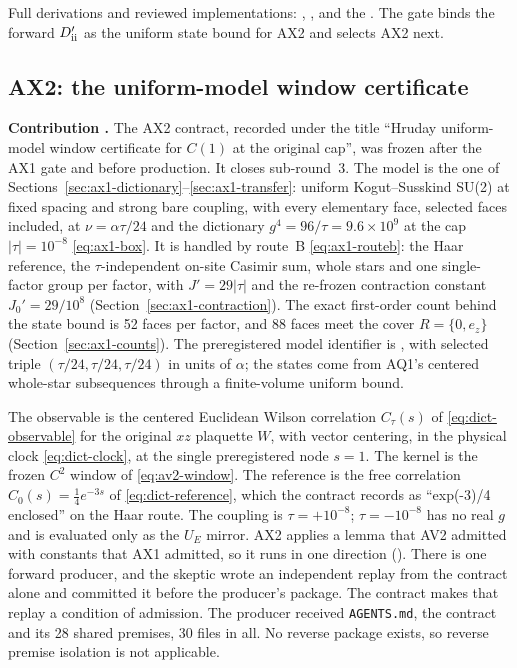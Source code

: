 Full derivations and reviewed implementations:
,
,
 and the
. The gate binds
the forward $D'_{\rm ii}$ as the uniform state bound for AX2 and selects AX2
next.

\subsection{AX2: the uniform-model window certificate}
\label{sec:ax2}

\textbf{Contribution .} The AX2 contract, recorded under
the title ``Hruday uniform-model window certificate for $C(1)$ at the original
cap'', was frozen after the AX1 gate and before production. It closes
sub-round~3. The model is the one of
Sections~\ref{sec:ax1-dictionary}--\ref{sec:ax1-transfer}: uniform
Kogut--Susskind SU(2) at fixed spacing and strong bare coupling, with every
elementary face, selected faces included, at $\nu=\alpha\tau/24$ and the
dictionary $g^4=96/\tau=9.6\times10^9$ at the cap $|\tau|=10^{-8}$
\eqref{eq:ax1-box}. It is handled by route~B \eqref{eq:ax1-routeb}: the Haar
reference, the $\tau$-independent on-site Casimir sum, whole stars and one
single-factor group per factor, with $J'=29|\tau|$ and the re-frozen
contraction constant $J_0'=29/10^8$ (Section~\ref{sec:ax1-contraction}). The exact first-order
count behind the state bound is 52 faces per factor, and 88 faces meet the
cover $R=\{0,e_z\}$ (Section~\ref{sec:ax1-counts}). The preregistered model
identifier is , with selected triple
$(\tau/24,\tau/24,\tau/24)$ in units of $\alpha$; the states come from
AQ1's centered whole-star subsequences through a finite-volume uniform bound.

The observable is the centered Euclidean Wilson correlation $C_\tau(s)$ of
\eqref{eq:dict-observable} for the original $xz$ plaquette $W$, with vector
centering, in the physical clock \eqref{eq:dict-clock}, at the single
preregistered node $s=1$. The kernel is the frozen $C^2$ window of
\eqref{eq:av2-window}. The reference is the free correlation
$C_0(s)=\tfrac14e^{-3s}$ of \eqref{eq:dict-reference}, which the contract
records as ``exp(-3)/4 enclosed'' on the Haar route. The coupling is
$\tau=+10^{-8}$; $\tau=-10^{-8}$ has no real $g$ and is evaluated only as the
$U_E$ mirror. AX2 applies a lemma that AV2 admitted with constants that AX1
admitted, so it runs in one direction (). There is one
forward producer, and the skeptic wrote an independent replay from the
contract alone and committed it before the producer's package. The contract
makes that replay a condition of admission. The producer received
\texttt{AGENTS.md}, the contract and its 28 shared premises, 30 files in all.
No reverse package exists, so reverse premise isolation is not applicable.

